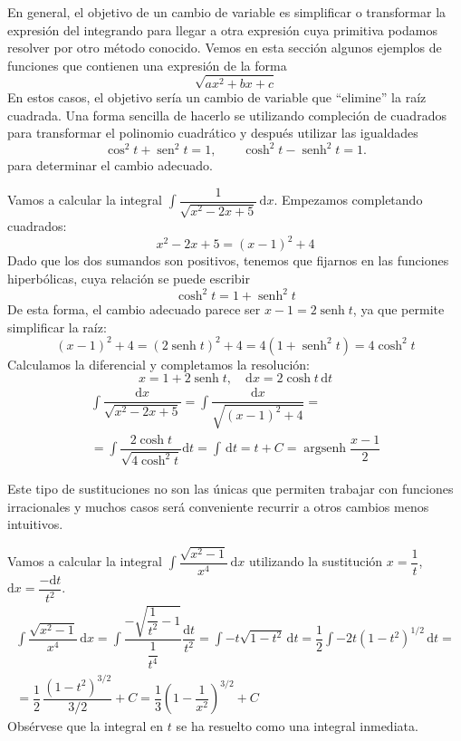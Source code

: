 En general, el objetivo de un cambio de variable es simplificar o transformar la expresión del integrando para llegar a otra expresión cuya primitiva podamos resolver por otro método conocido.
Vemos en esta sección algunos ejemplos de funciones que contienen una expresión de la forma
\[
\sqrt{ax^2+bx+c}
\]
En estos casos, el objetivo sería un cambio de variable que ``elimine'' la raíz cuadrada.
Una forma sencilla de hacerlo se utilizando compleción de cuadrados para transformar el polinomio cuadrático y después utilizar las igualdades
\[
\cos^2t+\operatorname{sen}^2t=1, \qquad
\cosh^2t-\operatorname{senh}^2t=1.
\]
para determinar el cambio adecuado.
%
\begin{ejemplo}
Vamos a calcular la integral $\displaystyle\int\dfrac{1}{\sqrt{x^2-2x+5}}\,\mathrm dx$.
Empezamos completando cuadrados:
\[
x^2-2x+5 = (x-1)^2+4%
\]
Dado que los dos sumandos son positivos, tenemos que fijarnos en las funciones hiperbólicas, cuya relación se puede escribir
\[
\cosh^2t=1+\operatorname{senh}^2t
\]
De esta forma, el cambio adecuado parece ser $x-1=2\operatorname{senh} t$, ya que permite simplificar la raíz:
\[
(x-1)^2+4 = (2\operatorname{senh} t)^2+4 =4(1+\operatorname{senh}^2t) = 4\cosh^2t
\]
Calculamos la diferencial y completamos la resolución:
\[
x=1+2\operatorname{senh} t,\quad \mathrm dx=2\cosh t\,\mathrm dt
\]
\begin{multline*}
\displaystyle\int\dfrac{\mathrm dx}{\sqrt{x^2-2x+5}} = \displaystyle\int\dfrac{\mathrm dx}{\sqrt{(x-1)^2+4}} = \\
=\displaystyle\int\dfrac{2\cosh t}{\sqrt{4\cosh^2t}}\mathrm dt = \displaystyle\int\,\mathrm dt
=t +C = \operatorname{argsenh}\dfrac{x-1}2\tag*{\fej}
\end{multline*}
\end{ejemplo}
Este tipo de sustituciones no son las únicas que permiten trabajar con funciones irracionales y muchos casos será conveniente recurrir a otros cambios menos intuitivos.
\begin{ejemplo}
Vamos a calcular la integral $\displaystyle\int\dfrac{\sqrt{x^2-1}}{x^4}\,\mathrm dx$ utilizando la sustitución $x=\dfrac1t$,
$\mathrm dx=\dfrac{-\mathrm dt}{t^2}$.
\begin{multline*}
\displaystyle\int\dfrac{\sqrt{x^2-1}}{x^4}\,\mathrm dx =
\displaystyle\int\dfrac{-\sqrt{\dfrac1{t^2}-1}}{\dfrac1{t^4}}\dfrac{\mathrm dt}{t^2} =
\displaystyle\int-t\sqrt{1-t^2}\,\mathrm dt = 
\dfrac12\displaystyle\int-2t(1-t^2)^{1/2}\,\mathrm dt = \\ =
\dfrac12\,\dfrac{(1-t^2)^{3/2}}{3/2}+C=
\dfrac13\left(1-\dfrac1{x^2}\right)^{3/2}+C
\end{multline*}
Obsérvese que la integral en $t$ se ha resuelto como una integral inmediata.\fej
\end{ejemplo}


